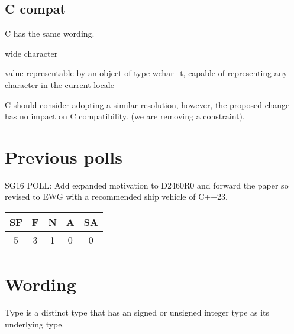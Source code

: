 \documentclass{wg21}
\begin{document}
\subsection{C compat}

C has the same wording.

\begin{quoteblock}
wide character

value representable by an object of type wchar_t, capable of representing any character in the current locale
\end{quoteblock}

C should consider adopting a similar resolution, however, the proposed change has no impact on C compatibility.
(we are removing a constraint).


\section{Previous polls}


\begin{quoteblock}
SG16 POLL: Add expanded motivation to D2460R0 and forward the paper so
revised to EWG with a recommended ship vehicle of C++23.

\begin{tabular}{|c|c|c|c|c|}
    \hline
    SF & F & N & A & SA\\
    \hline
     5 & 3 & 1 & 0 & 0 \\
    \hline
\end{tabular}
\end{quoteblock}



\section{Wording}


\pnum
{}%
%
%
Type  is a distinct type that has
an 
signed or unsigned integer type as its underlying type.


\end{document}

